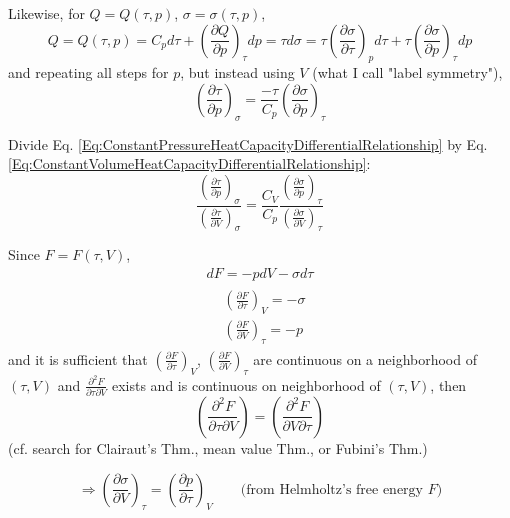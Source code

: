 \documentclass[10pt]{amsart}
\begin{document}
\begin{multicols*}{2}
Likewise, for $Q= Q(\tau, p)$, $\sigma = \sigma(\tau, p)$, 
\[
Q = Q(\tau, p) = C_p d\tau + \left( \frac{\partial Q}{\partial p } \right)_{\tau} dp = \tau d\sigma = \tau \left( \frac{\partial \sigma}{\partial \tau} \right)_p d\tau + \tau \left( \frac{\partial \sigma}{ \partial p} \right)_{\tau} dp
\]
and repeating all steps for $p$, but instead using $V$ (what I call "label symmetry"), 
\begin{equation}\label{Eq:ConstantPressureHeatCapacityDifferentialRelationship}
\left( \frac{\partial \tau}{\partial p } \right)_{\sigma} = \frac{-\tau}{C_p} \left( \frac{\partial \sigma}{\partial p} \right)_{\tau}
\end{equation}

Divide Eq. \ref{Eq:ConstantPressureHeatCapacityDifferentialRelationship} by Eq. \ref{Eq:ConstantVolumeHeatCapacityDifferentialRelationship}:
\begin{equation}\label{Eq:ConstantPressureHeatCapacityRelationshipOverConstantVolume}
\frac{ \left( \frac{\partial \tau}{\partial p}\right)_{\sigma} }{ \left( \frac{\partial \tau}{\partial V}\right)_{\sigma} } = \frac{C_V}{C_p} \frac{ \left( \frac{\partial \sigma}{\partial p}\right)_{\tau} }{ \left( \frac{\partial \sigma}{\partial V}\right)_{\tau} }
\end{equation} 

Since $F= F(\tau, V)$, 
\[
\begin{gathered}
dF = -pdV - \sigma d\tau \\
\begin{aligned}
& \left(\frac{\partial F}{\partial \tau} \right)_V = -\sigma \\ 
& \left(\frac{\partial F}{\partial V} \right)_{\tau} = - p 
\end{aligned}
\end{gathered}
\]
and it is sufficient that $\left(\frac{\partial F}{\partial \tau} \right)_V$, $\left(\frac{\partial F}{\partial V} \right)_{\tau}$ are continuous on a neighborhood of $(\tau, V)$ and $\frac{\partial^2 F}{ \partial \tau \partial V}$ exists and is continuous on neighborhood of $(\tau, V)$, then
\[
\left(\frac{\partial^2 F}{\partial \tau \partial V} \right) = \left(\frac{\partial^2 F}{\partial V \partial \tau} \right)
\]
(cf. search for Clairaut's Thm., mean value Thm., or Fubini's Thm.)

\begin{equation}\label{Eq:2ndOrderPartialDerivativeHelmholtzRelationship}
\Longrightarrow \left( \frac{ \partial \sigma}{ \partial V} \right)_{\tau} = \left(\frac{\partial p}{\partial \tau } \right)_V \qquad \text{(from Helmholtz's free energy $F$)}
\end{equation}


\end{multicols*}
\end{document}
